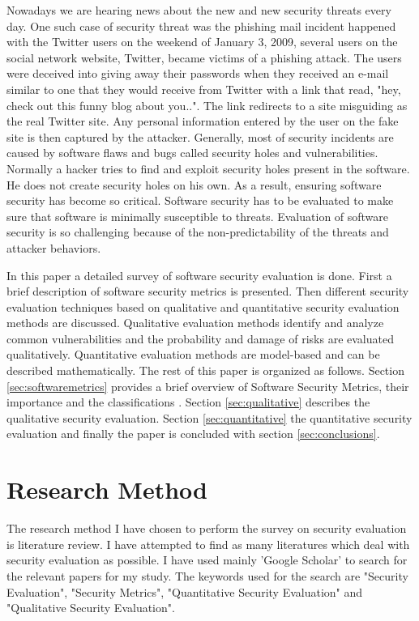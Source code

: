 \documentclass[pdftex,english,oribibl]{llncs}
\begin{document}
  Nowadays we are hearing news about the new and new security threats every day. One such case of security threat was the phishing mail incident happened with the Twitter users on the weekend of January 3, 2009, several users on the social network website, Twitter, became victims of a phishing attack. The users were deceived into giving away their passwords when they received an e-mail similar to one that they would receive from Twitter with a link that read, "hey, check out this funny blog about you..". The link redirects to a site misguiding as the real Twitter site. Any personal information entered by the user on the fake site is then captured by the attacker. Generally, most of security incidents are caused by software flaws and bugs called security holes and vulnerabilities. Normally a hacker tries to find and exploit security holes present in the software. He does not create security holes on his own. As a result, ensuring software security has become so critical. Software security has to be evaluated to make sure that software is minimally susceptible to threats. Evaluation of software security is so challenging because of the non-predictability of the threats and attacker behaviors. 

  In this paper a detailed survey of software security evaluation is done. First a brief description of software security metrics is presented. Then different security evaluation techniques based on qualitative and quantitative security evaluation methods are discussed. Qualitative evaluation methods identify and analyze common vulnerabilities and the probability and damage of risks are evaluated qualitatively. Quantitative evaluation methods are model-based and can be described mathematically. The rest of this paper is organized as follows. Section \ref{sec:softwaremetrics} provides a brief overview of Software Security Metrics, their importance and the classifications . Section \ref{sec:qualitative} describes the qualitative security evaluation. Section \ref{sec:quantitative} the quantitative security evaluation and finally the paper is concluded with section \ref{sec:conclusions}.

\section{Research Method}
The research method I have chosen to perform the survey on security evaluation is literature review. I have attempted to find as many literatures which deal with
security evaluation as possible. I have used mainly 'Google Scholar' to search for the relevant papers for my study. The keywords used for the search are  "Security Evaluation", "Security Metrics", "Quantitative Security Evaluation" and  "Qualitative Security Evaluation".
\end{document}
